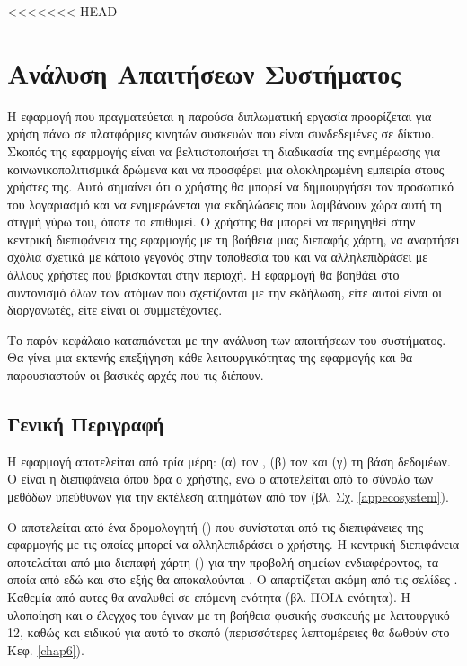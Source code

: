 <<<<<<< HEAD
\chapter{Ανάλυση Απαιτήσεων Συστήματος}
\label{chap3}

Η εφαρμογή που πραγματεύεται η παρούσα διπλωματική εργασία προορίζεται για χρήση πάνω σε πλατφόρμες κινητών συσκευών που είναι συνδεδεμένες σε δίκτυο. Σκοπός της εφαρμογής είναι να βελτιστοποιήσει τη διαδικασία της ενημέρωσης για κοινωνικοπολιτισμικά δρώμενα και να προσφέρει μια ολοκληρωμένη εμπειρία στους χρήστες της. Αυτό σημαίνει ότι ο χρήστης θα μπορεί να δημιουργήσει τον προσωπικό του λογαριασμό και να ενημερώνεται για εκδηλώσεις που λαμβάνουν χώρα αυτή τη στιγμή γύρω του, όποτε το επιθυμεί. Ο χρήστης θα μπορεί να περιηγηθεί στην κεντρική διεπιφάνεια της εφαρμογής με τη βοήθεια μιας διεπαφής χάρτη, να αναρτήσει σχόλια σχετικά με κάποιο γεγονός στην τοποθεσία του και να αλληλεπιδράσει με άλλους χρήστες που βρισκονται στην περιοχή. Η εφαρμογή θα βοηθάει στο συντονισμό όλων των ατόμων που σχετίζονται με την εκδήλωση, είτε αυτοί είναι οι διοργανωτές, είτε είναι οι συμμετέχοντες.

Το παρόν κεφάλαιο καταπιάνεται με την ανάλυση των απαιτήσεων του συστήματος. Θα γίνει μια εκτενής επεξήγηση κάθε λειτουργικότητας της εφαρμογής και θα παρουσιαστούν οι βασικές αρχές που τις διέπουν.

\section{Γενική Περιγραφή}
Η εφαρμογή αποτελείται από τρία μέρη: (α) τον , (β) τον  και (γ) τη βάση δεδομέων. Ο  είναι η διεπιφάνεια όπου δρα ο χρήστης, ενώ ο  αποτελείται από το σύνολο των μεθόδων υπεύθυνων για την εκτέλεση αιτημάτων από τον  (βλ. Σχ. \ref{appecosystem}).

Ο  αποτελείται από ένα δρομολογητή () που συνίσταται από τις διεπιφάνειες της εφαρμογής με τις οποίες μπορεί να αλληλεπιδράσει ο χρήστης. Η κεντρική διεπιφάνεια αποτελείται από μια διεπαφή χάρτη () για την προβολή σημείων ενδιαφέροντος, τα οποία από εδώ και στο εξής θα αποκαλούνται . Ο  απαρτίζεται ακόμη από τις σελίδες . Καθεμία από αυτες θα αναλυθεί σε επόμενη ενότητα (βλ. ΠΟΙΑ ενότητα). Η υλοποίηση και ο έλεγχος του  έγιναν με τη βοήθεια φυσικής συσκευής με λειτουργικό  12, καθώς και ειδικού  για αυτό το σκοπό (περισσότερες λεπτομέρειες θα δωθούν στο Κεφ. \ref{chap6}).

